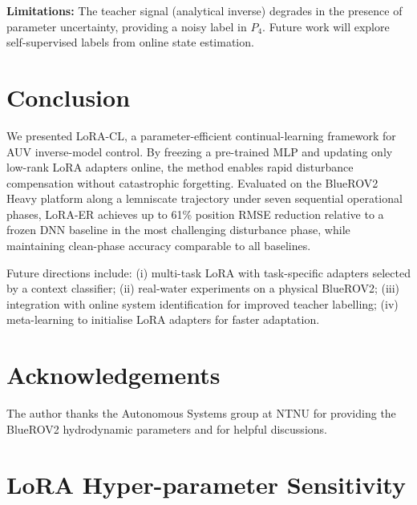 \documentclass[journal]{IEEEtran}
\begin{document}
\textbf{Limitations:}
The teacher signal (analytical inverse) degrades in the presence of
parameter uncertainty, providing a noisy label in $P_4$. Future work
will explore self-supervised labels from online state estimation.

\section{Conclusion}
\label{sec:conclusion}

We presented LoRA-CL, a parameter-efficient continual-learning framework
for AUV inverse-model control. By freezing a pre-trained MLP and updating
only low-rank LoRA adapters online, the method enables rapid disturbance
compensation without catastrophic forgetting. Evaluated on the BlueROV2
Heavy platform along a lemniscate trajectory under seven sequential
operational phases, LoRA-ER achieves up to 61\% position RMSE reduction
relative to a frozen DNN baseline in the most challenging disturbance phase,
while maintaining clean-phase accuracy comparable to all baselines.

Future directions include:
(i) multi-task LoRA with task-specific adapters selected by a context
    classifier;
(ii) real-water experiments on a physical BlueROV2;
(iii) integration with online system identification for improved teacher
    labelling;
(iv) meta-learning to initialise LoRA adapters for faster adaptation.

\section*{Acknowledgements}

The author thanks the Autonomous Systems group at NTNU for providing the
BlueROV2 hydrodynamic parameters and for helpful discussions.




\appendix
\section{LoRA Hyper-parameter Sensitivity}
\label{app:hyperparam}
\end{document}
